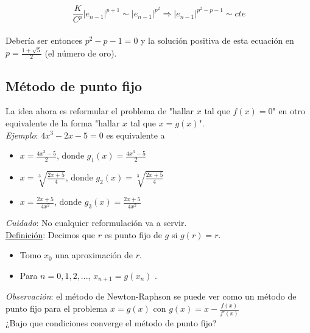 $$\frac{K}{C^{p}}|e_{n - 1}|^{p + 1} \sim |e_{n - 1}|^{p^{2}} \Rightarrow |e_{n - 1}|^{p^{2} - p - 1} \sim cte$$\\

Deber\'ia ser entonces $p^{2} - p - 1 = 0$ y la soluci\'on positiva de esta ecuaci\'on en $p = \frac{1 + \sqrt{5}}{2}$ (el n\'umero de oro).

\subsection{M\'etodo de punto fijo}

La idea ahora es reformular el problema de "hallar $x$ tal que $f(x) = 0$" en otro equivalente de la forma "hallar $x$ tal que $x = g(x)$".\\

\textit{Ejemplo}: $4x^{3} - 2x - 5 = 0$ es equivalente a

\begin{itemize}
    \item $x = \frac{4x^{3} - 5}{2}$, donde $g_{1}(x) = \frac{4x^{3} - 5}{2}$
    
    \item $x = \sqrt[3]{\frac{2x + 5}{4}}$, donde $g_{2}(x) = \sqrt[3]{\frac{2x + 5}{4}}$
    
    \item $x = \frac{2x + 5}{4x^{2}}$, donde $g_{3}(x) = \frac{2x + 5}{4x^{2}}$
\end{itemize}

\textit{Cuidado}: No cualquier reformulaci\'on va a servir.\\

\underline{Definici\'on}: Decimos que $r$ es punto fijo de $g$ si $g(r) = r$.\\

\begin{itemize}
    \item Tomo $x_{0}$ una aproximaci\'on de $r$.

    \item Para $n = 0, 1, 2, ...$, $x_{n + 1} = g(x_{n})$ .
\end{itemize}

\textit{Observaci\'on}: el m\'etodo de Newton-Raphson se puede ver como un m\'etodo de punto fijo para el problema $x = g(x)$ con $g(x) = x - \frac{f(x)}{f'(x)}$\\

¿Bajo que condiciones converge el m\'etodo de punto fijo?\\

